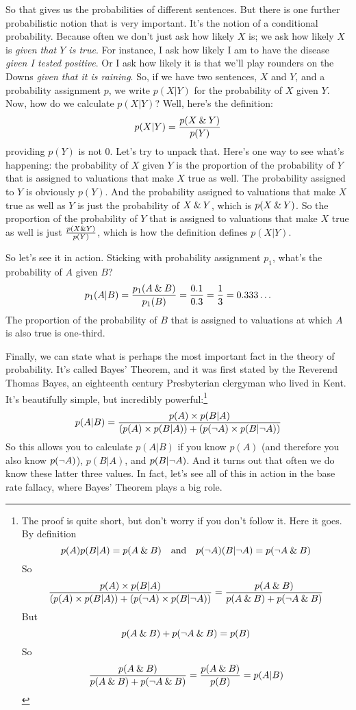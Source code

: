 So that gives us the probabilities of different sentences. But there is one further probabilistic notion that is very important. It's the notion of a conditional probability. Because often we don't just ask how likely $X$ is; we ask how likely $X$ is \emph{given that $Y$ is true}. For instance, I ask how likely I am to have the disease \emph{given I tested positive}. Or I ask how likely it is that we'll play rounders on the Downs \emph{given that it is raining}. So, if we have two sentences, $X$ and $Y$, and a probability assignment $p$, we write $p(X | Y)$ for the probability of $X$ given $Y$. Now, how do we calculate $p(X |Y)$? Well, here's the definition:
\[
p(X | Y) = \frac{p(X\mathbin{\&} Y)}{p(Y)}
\]
providing $p(Y)$ is not 0. Let's try to unpack that. Here's one way to see what's happening: the probability of $X$ given $Y$ is the proportion of the probability of $Y$ that is assigned to valuations that make $X$ true as well. The probability assigned to $Y$ is obviously $p(Y)$. And the probability assigned to valuations that make $X$ true as well as $Y$ is just the probability of $X \mathbin{\&} Y$, which is $p(X \mathbin{\&} Y)$. So the proportion of the probability of $Y$ that is assigned to valuations that make $X$ true as well is just $\frac{p(X\mathbin{\&} Y)}{p(Y)}$, which is how the definition defines $p(X | Y)$.

So let's see it in action. Sticking with probability assignment $p_1$, what's the probability of $A$ given $B$?
\[
p_1(A | B) = \frac{p_1(A\mathbin{\&} B)}{p_1(B)} = \frac{0.1}{0.3} = \frac{1}{3} = 0.333\ldots
\]
The proportion of the probability of $B$ that is assigned to valuations at which $A$ is also true is one-third.

Finally, we can state what is perhaps the most important fact in the theory of probability. It's called Bayes' Theorem, and it was first stated by the Reverend Thomas Bayes, an eighteenth century Presbyterian clergyman who lived in Kent. It's beautifully simple, but incredibly powerful:\footnote{The proof is quite short, but don't worry if you don't follow it. Here it goes. By definition 
\[
p(A) p(B|A) = p(A\mathbin{\&} B) \mbox{\ \ \ and\ \ \ } p(\neg A)(B | \neg A) = p(\neg A\mathbin{\&} B)
\]
So
\[
\frac{p(A) \times p(B|A)}{(p(A) \times p(B|A)) + (p(\neg A)\times p(B|\neg A))} = \frac{p(A\mathbin{\&} B)}{p(A\mathbin{\&} B) + p(\neg A\mathbin{\&} B)}
\]
But
\[
p(A\mathbin{\&} B) + p(\neg A\mathbin{\&} B) = p(B)
\]
So
\[
\frac{p(A\mathbin{\&} B)}{p(A\mathbin{\&} B) + p(\neg A\mathbin{\&} B)} = \frac{p(A\mathbin{\&} B)}{p(B)} = p(A|B)
\]
}
\[
p(A | B) = \frac{p(A) \times p(B|A)}{(p(A) \times p(B|A)) + (p(\neg A)\times p(B|\neg A))}
\]
So this allows you to calculate $p(A|B)$ if you know $p(A)$ (and therefore you also know $p(\neg A)$), $p(B|A)$, and $p(B | \neg A)$. And it turns out that often we do know these latter three values. In fact, let's see all of this in action in the base rate fallacy, where Bayes' Theorem plays a big role.

